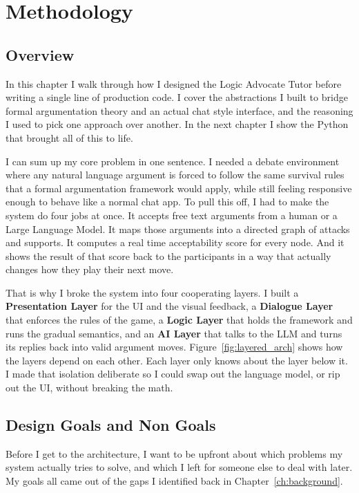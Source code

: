 \chapter{Methodology}
\label{ch:methodology}

\section{Overview}
In this chapter I walk through how I designed the Logic Advocate Tutor before writing a single line of production code. I cover the abstractions I built to bridge formal argumentation theory and an actual chat style interface, and the reasoning I used to pick one approach over another. In the next chapter I show the Python that brought all of this to life.

I can sum up my core problem in one sentence. I needed a debate environment where any natural language argument is forced to follow the same survival rules that a formal argumentation framework would apply, while still feeling responsive enough to behave like a normal chat app. To pull this off, I had to make the system do four jobs at once. It accepts free text arguments from a human or a Large Language Model. It maps those arguments into a directed graph of attacks and supports. It computes a real time acceptability score for every node. And it shows the result of that score back to the participants in a way that actually changes how they play their next move.

That is why I broke the system into four cooperating layers. I built a \textbf{Presentation Layer} for the UI and the visual feedback, a \textbf{Dialogue Layer} that enforces the rules of the game, a \textbf{Logic Layer} that holds the framework and runs the gradual semantics, and an \textbf{AI Layer} that talks to the LLM and turns its replies back into valid argument moves. Figure~\ref{fig:layered_arch} shows how the layers depend on each other. Each layer only knows about the layer below it. I made that isolation deliberate so I could swap out the language model, or rip out the UI, without breaking the math.

\section{Design Goals and Non Goals}
\label{sec:goals}
Before I get to the architecture, I want to be upfront about which problems my system actually tries to solve, and which I left for someone else to deal with later. My goals all came out of the gaps I identified back in Chapter~\ref{ch:background}.

